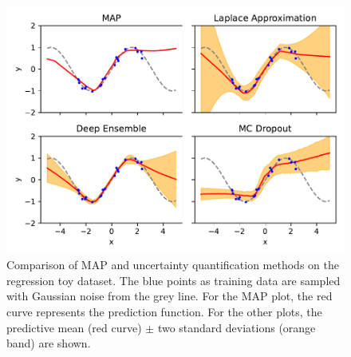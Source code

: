 \begin{figure}
  \centering
  \includegraphics{images/regr_comparison.pdf}
  \caption{Comparison of MAP and uncertainty quantification methods on the regression toy dataset. The blue points as training data are sampled with Gaussian noise from the grey line. For the MAP plot, the red curve represents the prediction function. For the other plots, the predictive mean (red curve) $\pm$ two standard deviations (orange band) are shown.}
  \label{fig:regr}
\end{figure}

